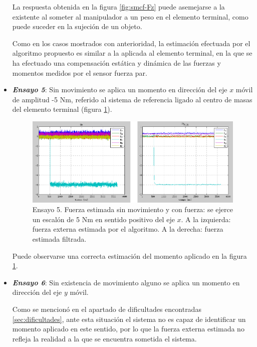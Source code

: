 \begin{itemize}
La respuesta obtenida en la figura \ref{fig:smcf-Fz} puede asemejarse a la existente al someter al manipulador a un peso en el elemento terminal, como puede suceder en la sujeción de un objeto. \par 

Como en los casos mostrados con anterioridad, la estimación efectuada por el algoritmo propuesto es similar a la aplicada al elemento terminal, en la que se ha efectuado una compensación estática y dinámica de las fuerzas y momentos medidos por el sensor fuerza par. \par 

\item \textbf{\emph{Ensayo 5}}: Sin movimiento se aplica un momento en dirección del eje $x$ móvil de amplitud -5 Nm, referido al sistema de referencia ligado al centro de masas del elemento terminal (figura \ref{fig:smcf-Nx}). \par 

\begin{figure}[h!]
\centering
\includegraphics[scale=0.4]{Figuras/smcf-Nx}
\caption[Ensayo 5. Fuerza estimada sin movimiento y con fuerza]{Ensayo 5. Fuerza estimada sin movimiento y con fuerza: se ejerce un escalón de 5 Nm en sentido positivo del eje $x$. A la izquierda: fuerza externa estimada por el algoritmo. A la derecha: fuerza estimada filtrada.}
\label{fig:smcf-Nx}
\end{figure}

Puede observarse una correcta estimación del momento aplicado en la figura \ref{fig:smcf-Nx}. \par 

\item \textbf{\emph{Ensayo 6}}: Sin existencia de movimiento alguno se aplica un momento en dirección del eje $y$ móvil. \par 

Como se mencionó en el apartado de dificultades encontradas \ref{sec:dificultades}, ante esta situación el sistema no es capaz de identificar un momento aplicado en este sentido, por lo que la fuerza externa estimada no refleja la realidad a la que se encuentra sometida el sistema. \par 


\end{itemize}
